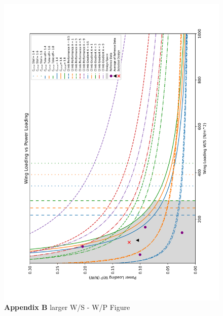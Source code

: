 \documentclass[12pt]{article}
\begin{document}
		\newpage
		


			\begin{figure}[h!]
				\centering
				\includegraphics[width=7in]{Figures/Wing_Loading_vs_Power_Loading_appendix.png}  %
				\caption{ \textbf{Appendix B} larger W/S - W/P Figure}
				\label{fig:fullpage}
			\end{figure}

		\newpage
		
\end{document}
